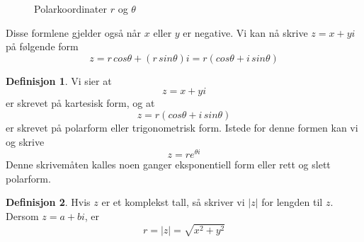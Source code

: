 \documentclass[11pt]{article}
\theoremstyle{definition}
\newtheorem{mindef}{Definisjon}[section]
\newenvironment{fmindef}
{\begin{mdframed}[style=minstil]\begin{mindef}}
		{\end{mindef}\end{mdframed}}
\theoremstyle{definition}
\theoremstyle{definition}
\theoremstyle{definition}
\theoremstyle{definition}
\theoremstyle{definition}
\begin{document}
	\begin{figure}[!ht]
		\centering
		\caption{Polarkoordinater \(r\) og \(\theta \)}
	\end{figure}
	
	Disse formlene  gjelder også når \(x\) eller \(y\) er negative. Vi kan nå skrive \(z=x+yi\) på følgende form \[z=r\, cos\theta + (r\, sin\theta )i = r(cos\theta + i\, sin\theta ) \]
	
	\newpage
	\begin{fmindef}
		Vi sier at \[z=x+yi\] er skrevet på kartesisk form, og at \[z=r(cos\theta + i\, sin\theta )  \]
		er skrevet på polarform eller trigonometrisk form. Istede for denne formen kan vi og skrive \[z=re^{\theta i}\]
		Denne skrivemåten kalles noen ganger eksponentiell form eller rett og slett polarform.
	\end{fmindef}
	
	\begin{fmindef}
		Hvis \(z\) er et komplekst tall, så skriver vi \(|z|\) for lengden til \(z\). Dersom \(z=a+bi\), er \[r=|z|=\sqrt{x^2+y^2} \]
	\end{fmindef}
	
\end{document}
